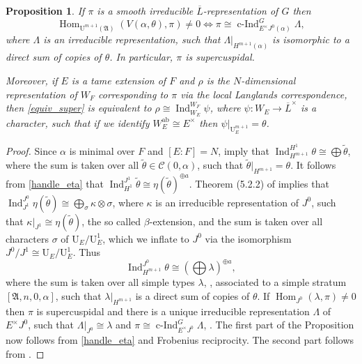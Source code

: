 \documentclass[11pt]{article}
\let\mathcal\mathscr
\newtheorem{prop}{Proposition}[section]
\theoremstyle{definition}
\DeclareMathOperator{\Hom}{Hom}
\DeclareMathOperator{\Ind}{Ind}
\DeclareMathOperator{\cInd}{c-Ind}
\newcommand{\cIndu}[3]{\cInd_{#1}^{#2}{#3}}
\newcommand{\Indu}[3]{\Ind_{#1}^{#2}{#3}}
\newcommand{\Aa}{\mathfrak A}
\newcommand{\UU}{\mathrm U}
\newcommand{\Lbar}{\overline{L}}
\begin{document}
\begin{prop}\label{types_super} If $\pi$ is a smooth irreducible $\Lbar$-representation of $G$ then
\begin{equation}\label{equiv_super}
\Hom_{\UU^{m+1}(\Aa)}( V(\alpha, \theta), \pi)\neq 0 \iff\pi\cong \cIndu{E^{\times}J^0(\alpha)}{G}{\Lambda},
\end{equation}
where $\Lambda$ is an irreducible representation, such that $\Lambda|_{H^{m+1}(\alpha)}$ is isomorphic to a direct sum of copies of $\theta$. In particular,
$\pi$ is supercuspidal.

Moreover, if $E$ is a tame extension of $F$ and $\rho$ is the $N$-dimensional representation of $W_F$ corresponding to $\pi$ via the
local Langlands correspondence, then \eqref{equiv_super} is equivalent to $\rho\cong \Indu{W_E}{W_F}{\psi}$, where $\psi: W_E \to \Lbar^{\times}$
is a character, such that if we identify $W_E^{\mathrm{ab}}\cong E^{\times}$ then $\psi|_{\UU^{m+1}_E}=\theta$.
\end{prop}

\begin{proof} Since $\alpha$ is minimal over $F$ and $[E:F]=N$, \cite[(3.2.5), (3.3.18)]{BK} imply that $\Indu{H^{m+1}}{H^1}{\theta}\cong \bigoplus \tilde{\theta}$,
where the sum is taken over all $\tilde{\theta}\in \mathcal C(0, \alpha)$, such that \hbox{$\tilde{\theta}|_{H^{m+1}}= \theta$}. It follows from
\eqref{handle_eta} that $\Indu{H^1}{J^1}{\tilde{\theta}}\cong \eta(\tilde{\theta})^{\oplus a}$. Theorem (5.2.2) of \cite{BK} implies that
$\Indu{J^1}{J^0}{\eta(\tilde{\theta})}\cong \bigoplus_{\sigma} \kappa\otimes \sigma$, where $\kappa$ is an irreducible representation of $J^0$, such that $\kappa|_{J^1}\cong \eta(\tilde{\theta})$,
the so called $\beta$-extension, and the sum is taken over all characters $\sigma$ of $\UU_E/\UU^1_E$, which we inflate to $J^0$ via the isomorphism
$J^0/J^1\cong \UU_E/\UU^1_E$. Thus
\begin{equation}
\Indu{H^{m+1}}{J^{0}}{\theta}\cong (\bigoplus \lambda)^{\oplus a},
\end{equation}
where the sum is taken over all simple types $\lambda$, \cite[(5.5.10)]{BK}, associated to a simple stratum $[\mathfrak A, n, 0,\alpha]$, such that
$\lambda |_{H^{m+1}}$ is a direct sum of copies of $\theta$. If $\Hom_{J^0}(\lambda, \pi)\neq 0$ then $\pi$ is supercuspidal and there is a unique
irreducible representation $\Lambda$ of $E^{\times} J^0$, such that $\Lambda|_{J^0}\cong \lambda$ and $\pi\cong \cIndu{E^{\times}J^0}{G}{\Lambda}$, \cite[(6.2.2)]{BK}.
The first part of the Proposition now follows from \eqref{handle_eta} and Frobenius reciprocity. The second part follows from \cite{BH}.
\end{proof}
\end{document}
